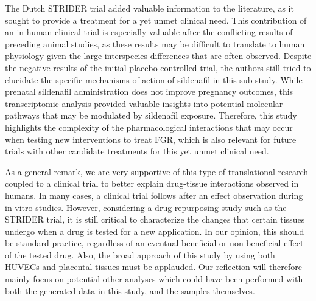 \documentclass[authordate, reflection]{jote-new-article}
\begin{document}
	The Dutch STRIDER trial added valuable information to the literature, as it sought to provide a treatment for a yet unmet clinical need. This contribution of an in-human clinical trial is especially valuable after the conflicting results of preceding animal studies, as these results may be difficult to translate to human physiology given the large interspecies differences that are often observed. Despite the negative results of the initial placebo-controlled trial, the authors still tried to elucidate the specific mechanisms of action of sildenafil in this sub study. While prenatal sildenafil administration does not improve pregnancy outcomes, this transcriptomic analysis provided valuable insights into potential molecular pathways that may be modulated by sildenafil exposure. Therefore, this study highlights the complexity of the pharmacological interactions that may occur when testing new interventions to treat FGR, which is also relevant for future trials with other candidate treatments for this yet unmet clinical need.



	As a general remark, we are very supportive of this type of translational research coupled to a clinical trial to better explain drug-tissue interactions observed in humans. In many cases, a clinical trial follows after an effect observation during in-vitro studies. However, considering a drug repurposing study such as the STRIDER trial, it is still critical to characterize the changes that certain tissues undergo when a drug is tested for a new application. In our opinion, this should be standard practice, regardless of an eventual beneficial or non-beneficial effect of the tested drug. Also, the broad approach of this study by using both HUVECs and placental tissues must be applauded. Our reflection will therefore mainly focus on potential other analyses which could have been performed with both the generated data in this study, and the samples themselves.
\end{document}
